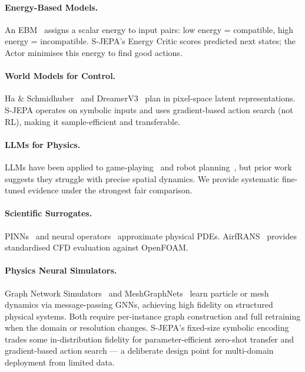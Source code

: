 \documentclass[10pt,twocolumn]{article}
\begin{document}
\paragraph{Energy-Based Models.}
An EBM~\citep{lecun2006ebm} assigns a scalar energy to input pairs: low energy = compatible,
high energy = incompatible. S-JEPA's Energy Critic scores predicted next states; the Actor
minimises this energy to find good actions.

\paragraph{World Models for Control.}
Ha \& Schmidhuber~\citep{ha2018worldmodels} and DreamerV3~\citep{hafner2023dreamerv3}
plan in pixel-space latent representations. S-JEPA operates on symbolic inputs and uses
gradient-based action search (not RL), making it sample-efficient and transferable.

\paragraph{LLMs for Physics.}
LLMs have been applied to game-playing~\citep{brown2020gpt3} and robot
planning~\citep{ahn2022saycan}, but prior work suggests they struggle with precise spatial
dynamics. We provide systematic fine-tuned evidence under the strongest fair comparison.

\paragraph{Scientific Surrogates.}
PINNs~\citep{raissi2019pinn} and neural operators~\citep{li2020fno} approximate physical
PDEs. AirfRANS~\citep{bonnet2022airfrans} provides standardised CFD evaluation against
OpenFOAM.

\paragraph{Physics Neural Simulators.}
Graph Network Simulators~\citep{sanchez2020gns} and MeshGraphNets~\citep{pfaff2021meshgraphnets}
learn particle or mesh dynamics via message-passing GNNs, achieving high fidelity on
structured physical systems. Both require per-instance graph construction and full
retraining when the domain or resolution changes.
S-JEPA's fixed-size symbolic encoding trades some in-distribution fidelity for
parameter-efficient zero-shot transfer and gradient-based action search — a deliberate
design point for multi-domain deployment from limited data.
\end{document}
